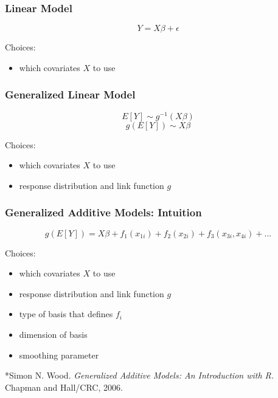 \documentclass{beamer}
\begin{document}
\begin{frame}
\frametitle{Linear Model}

$$ Y = X\beta +  \epsilon $$

Choices:

\begin{itemize}
\item which covariates $X$ to use
\end{itemize}


\end{frame}

\begin{frame}
\frametitle{Generalized Linear Model}

$$ E[Y] \sim g^{-1}(X\beta) $$
$$ g(E[Y]) \sim X\beta $$

Choices:

\begin{itemize}
\item which covariates $X$ to use
\item response distribution and link function $g$
\end{itemize}


\end{frame}

\begin{frame}


\frametitle{Generalized Additive Models: Intuition}

$$ g(E[Y]) = X\beta + f_1(x_{1i})+f_2(x_{2i})+f_3(x_{3i},x_{4i})+... $$

Choices: 
\begin{itemize}
\item which covariates $X$ to use
\item response distribution and link function $g$
\item type of basis that defines $f_i$
\item dimension of basis
\item smoothing parameter
\end{itemize}
\vspace{.5in}
\footnotesize{*Simon N. Wood. \textit{Generalized Additive Models: An Introduction with R.} Chapman and Hall/CRC, 2006.}
\end{frame}
\end{document}

